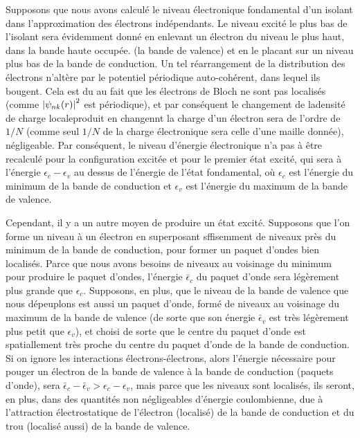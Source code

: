 Supposons que nous avons calculé le niveau électronique fondamental d'un isolant dans l'approximation des électrons indépendants. Le niveau excité le plus bas de l'isolant sera évidemment donné en enlevant un électron du niveau le plus haut, dans la bande haute occupée. (la bande de valence) et en le placant sur un niveau plus bas de la bande de conduction. Un tel réarrangement de la distribution des électrons n'altère par le potentiel périodique auto-cohérent, dans lequel ils bougent. Cela est du au fait que les électrons de Bloch ne sont pas localisés (comme $\left| \psi_{nk}(r) \right|^2$ est périodique), et par conséquent le changement de ladensité de charge localeproduit en changennt la charge d'un électron sera de l'ordre de $1/N$ (comme seul $1/N$ de la charge électronique sera celle d'une maille donnée), \ie négligeable. Par conséquent, le niveau d'énergie électronique n'a pas à être recalculé pour la configuration excitée et pour le premier état excité, qui sera à l'énergie $\epsilon_c - \epsilon_v$ au dessus de l'énergie de l'état fondamental, où $\epsilon_c$ est l'énergie du minimum de la bande de conduction et $\epsilon_v$ est l'énergie du maximum de la bande de valence.

Cependant, il y a un autre moyen de produire un état excité. Supposons que l'on forme un niveau à un électron en superposant sffisemment de niveaux près du minimum de la bande de conduction, pour former un paquet d'ondes bien localisés. Parce que nous avons besoins de niveaux au voisinage du minimum pour produire le paquet d'ondes, l'énergie $\bar{\epsilon}_c$ du paquet d'onde sera légèrement plus grande que $\epsilon_c$. Supposons, en plus, que le niveau de la bande de valence que nous dépeuplons est aussi un paquet d'onde, formé de niveaux au voisinage du maximum de la bande de valence (de sorte que son énergie $\bar{\epsilon}_v$ est très légèrement plus petit que $\epsilon_v$), et choisi de sorte que le centre du paquet d'onde est spatiallement très proche du centre du paquet d'onde de la bande de conduction. Si on ignore les interactions électrons-électrons, alors l'énergie nécessaire pour pouger un électron de la bande de valence à la bande de conduction (paquets d'onde), sera $\bar{\epsilon}_c - \bar{\epsilon}_v > \epsilon_c - \epsilon_v$, mais parce que les niveaux sont localisés, ils seront, en plus, dans des quantités non négligeables d'énergie coulombienne, due à l'attraction électrostatique de l'électron (localisé) de la bande de conduction et du trou (localisé aussi) de la bande de valence.

